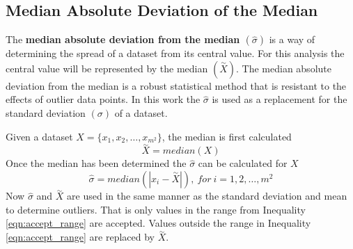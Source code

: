 \subsection{Median Absolute Deviation of the Median}
The \textbf{median absolute deviation from the median $\left(\hat{\sigma}\right)$} is a way of determining the spread of a dataset from its central value. For this analysis the central value will be represented by the median $\left(\overset{\sim}{X}\right)$. The median absolute deviation from the median is a robust statistical method that is resistant to the effects of outlier data points. In this work the $\hat{\sigma}$ is used as a replacement for the standard deviation $\left(\sigma\right)$ of a dataset.

Given a dataset $X = \{x_1, x_2,\dots,x_{m^2}\}$, the median is first calculated 
\begin{equation}
  \overset{\sim}{X} = median(X)
  \label{eqn:median}
\end{equation}
Once the median has been determined the $\hat{\sigma}$ can be calculated for $X$
\begin{equation}
  \hat{\sigma} = median \left( | x_i - \overset{\sim}{X} | \right),\ for\ i=1,2,\dots,m^2
\end{equation}
Now $\hat{\sigma}$ and $\overset{\sim}{X}$ are used in the same manner as the standard deviation and mean to determine outliers. That is only values in the range from Inequality \ref{eqn:accept_range} are accepted. Values outside the range in Inequality \ref{eqn:accept_range} are replaced by $\overset{\sim}{X}$.